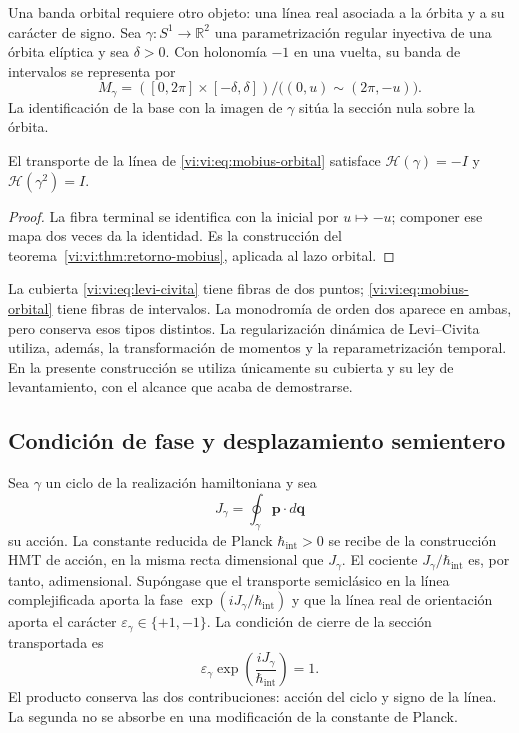 Una banda orbital requiere otro objeto: una línea real
asociada a la órbita y a su carácter de signo. Sea
$\gamma:S^1\to\mathbb R^2$ una parametrización regular
inyectiva de una órbita elíptica y sea $\delta>0$. Con
holonomía $-1$ en una vuelta, su banda de intervalos se
representa por
\begin{equation}
 M_\gamma=([0,2\pi]\times[-\delta,\delta])/
          \bigl((0,u)\sim(2\pi,-u)\bigr).
 \label{vi:vi:eq:mobius-orbital}
\end{equation}
La identificación de la base con la imagen de $\gamma$
sitúa la sección nula sobre la órbita.

\begin{proposition}
\label{vi:vi:prop:holonomia-orbital}
El transporte de la línea de \eqref{vi:vi:eq:mobius-orbital}
satisface
$\mathcal H(\gamma)=-I$ y $\mathcal H(\gamma^2)=I$.
\end{proposition}
\begin{proof}
La fibra terminal se identifica con la inicial por
$u\mapsto-u$; componer ese mapa dos veces da la identidad.
Es la construcción del
teorema~\ref{vi:vi:thm:retorno-mobius}, aplicada al lazo orbital.
\end{proof}

La cubierta \eqref{vi:vi:eq:levi-civita} tiene fibras de dos
puntos; \eqref{vi:vi:eq:mobius-orbital} tiene fibras de
intervalos. La monodromía de orden dos aparece en ambas,
pero conserva esos tipos distintos. La regularización
dinámica de Levi--Civita utiliza, además, la transformación
de momentos y la reparametrización temporal. En la presente
construcción se utiliza únicamente su cubierta y su ley de
levantamiento, con el alcance que acaba de demostrarse.

\subsection{Condición de fase y desplazamiento semientero}
\label{vi:vi:subsec:sommerfeld}

Sea $\gamma$ un ciclo de la realización hamiltoniana y sea
\begin{equation}
 J_\gamma=\oint_\gamma\mathbf p\cdot d\mathbf q
 \label{vi:vi:eq:accion-ciclo}
\end{equation}
su acción. La constante reducida de Planck
$\hbar_{\mathrm{int}}>0$ se recibe de la construcción HMT
de acción, en la misma recta dimensional que $J_\gamma$.
El cociente $J_\gamma/\hbar_{\mathrm{int}}$ es, por tanto,
adimensional. Supóngase que el transporte semiclásico en la
línea complejificada aporta la fase
$\exp(iJ_\gamma/\hbar_{\mathrm{int}})$ y que la línea real
de orientación aporta el carácter
$\varepsilon_\gamma\in\{+1,-1\}$. La condición de cierre
de la sección transportada es
\begin{equation}
 \varepsilon_\gamma
       \exp\!\left(\frac{iJ_\gamma}{\hbar_{\mathrm{int}}}\right)=1.
 \label{vi:vi:eq:cierre-sommerfeld}
\end{equation}
El producto conserva las dos contribuciones: acción del
ciclo y signo de la línea. La segunda no se absorbe en una
modificación de la constante de Planck.

